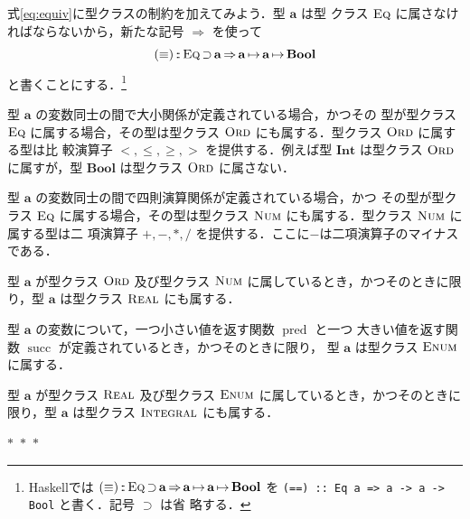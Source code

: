 \documentclass[a5paper,twoside,fleqn,draft]{jsbook}
\newcommand{\separator}{\begin{center}$*$~$*$~$*$\end{center}}
\newcommand{\programminglanguage}[1]{\textsf{#1}}
\newcommand{\haskell}{\programminglanguage{Haskell}}
\newcommand{\code}[1]{\texttt{#1}}
\DeclareMathOperator{\mSuperClass}{\Rightarrow}
\DeclareMathOperator{\mSuperSet}{\supset}
\newcommand{\mSpecialFunc}[1]{\mathrm{#1}}
\DeclareMathOperator{\mPred}{\mSpecialFunc{pred}}
\DeclareMathOperator{\mSucc}{\mSpecialFunc{succ}}
\DeclareMathOperator{\mIn}{{:\!:}}
\DeclareMathOperator{\mMapsTo}{\mapsto}
\newcommand{\mType}[1]{\mathbf{#1}}
\newcommand{\mBoolType}{\mType{Bool}}
\newcommand{\mIntType}{\mType{Int}}
\newcommand{\mGenericTypeClass}[1]{\textsc{#1}} %
\newcommand{\mEnumTypeClass}{\mGenericTypeClass{Enum}}
\newcommand{\mEqTypeClass}{\mGenericTypeClass{Eq}}
\newcommand{\mIntegralTypeClass}{\mGenericTypeClass{Integral}}
\newcommand{\mNumTypeClass}{\mGenericTypeClass{Num}}
\newcommand{\mOrdTypeClass}{\mGenericTypeClass{Ord}}
\newcommand{\mRealTypeClass}{\mGenericTypeClass{Real}}
\newcommand{\mProj}[2]{#1\mMapsTo#2}
\begin{document}
式\eqref{eq:equiv}に型クラスの制約を加えてみよう．型 $\mType{a}$ は型
クラス $\mEqTypeClass$ に属さなければならないから，新たな記号
$\mSuperClass$ を使って
\begin{equation}
(\equiv) \mIn{}\mEqTypeClass\mSuperSet\mType{a}
  \mSuperClass\mProj{\mProj{\mType{a}}{\mType{a}}}{\mBoolType}
\end{equation}
と書くことにする．\footnote{\haskell では
  $(\equiv)\mIn{}\mEqTypeClass\mSuperSet\mType{a}
  \mSuperClass\mProj{\mProj{\mType{a}}{\mType{a}}}{\mBoolType}$ を
  \code{(==) :: Eq a => a -> a -> Bool} と書く．記号 $\mSuperSet$ は省
  略する．}

型 $\mType{a}$ の変数同士の間で大小関係が定義されている場合，かつその
型が型クラス $\mEqTypeClass$ に属する場合，その型は型クラス
$\mOrdTypeClass$ にも属する．型クラス $\mOrdTypeClass$ に属する型は比
較演算子 $<,\le,\ge,>$ を提供する．例えば型 $\mIntType$ は型クラス
$\mOrdTypeClass$ に属すが，型 $\mBoolType$ は型クラス $\mOrdTypeClass$
に属さない．

型 $\mType{a}$ の変数同士の間で四則演算関係が定義されている場合，かつ
その型が型クラス $\mEqTypeClass$ に属する場合，その型は型クラス
$\mNumTypeClass$ にも属する．型クラス $\mNumTypeClass$ に属する型は二
項演算子 $+,-,*,/$ を提供する．ここに$-$は二項演算子のマイナスである．

型 $\mType{a}$ が型クラス $\mOrdTypeClass$ 及び型クラス
$\mNumTypeClass$ に属しているとき，かつそのときに限り，型 $\mType{a}$
は型クラス $\mRealTypeClass$ にも属する．

型 $\mType{a}$ の変数について，一つ小さい値を返す関数 $\mPred$ と一つ
大きい値を返す関数 $\mSucc$ が定義されているとき，かつそのときに限り，
型 $\mType{a}$ は型クラス $\mEnumTypeClass$ に属する．

型 $\mType{a}$ が型クラス $\mRealTypeClass$ 及び型クラス
$\mEnumTypeClass$ に属しているとき，かつそのときに限り，型 $\mType{a}$
は型クラス $\mIntegralTypeClass$ にも属する．


\separator
\end{document}
